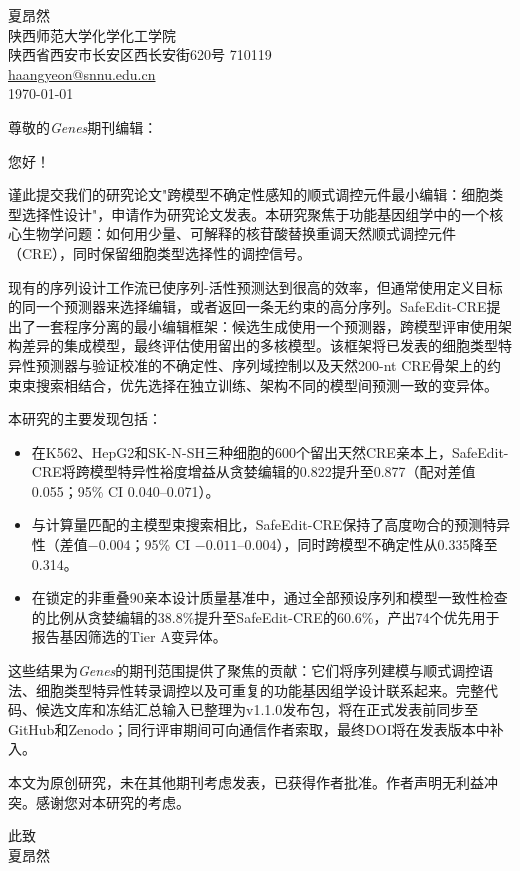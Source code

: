 \documentclass[11pt,a4paper]{article}
\begin{document}
\begin{flushright}
夏昂然\\
陕西师范大学化学化工学院\\
陕西省西安市长安区西长安街620号 710119\\
\href{mailto:haangyeon@snnu.edu.cn}{haangyeon@snnu.edu.cn}\\[1em]
\today
\end{flushright}

尊敬的\emph{Genes}期刊编辑：

您好！

谨此提交我们的研究论文"跨模型不确定性感知的顺式调控元件最小编辑：细胞类型选择性设计"，申请作为研究论文发表。本研究聚焦于功能基因组学中的一个核心生物学问题：如何用少量、可解释的核苷酸替换重调天然顺式调控元件（CRE），同时保留细胞类型选择性的调控信号。

现有的序列设计工作流已使序列-活性预测达到很高的效率，但通常使用定义目标的同一个预测器来选择编辑，或者返回一条无约束的高分序列。SafeEdit-CRE提出了一套程序分离的最小编辑框架：候选生成使用一个预测器，跨模型评审使用架构差异的集成模型，最终评估使用留出的多核模型。该框架将已发表的细胞类型特异性预测器与验证校准的不确定性、序列域控制以及天然200-nt CRE骨架上的约束束搜索相结合，优先选择在独立训练、架构不同的模型间预测一致的变异体。

本研究的主要发现包括：
\begin{itemize}
  \item 在K562、HepG2和SK-N-SH三种细胞的600个留出天然CRE亲本上，SafeEdit-CRE将跨模型特异性裕度增益从贪婪编辑的0.822提升至0.877（配对差值0.055；95\% CI 0.040--0.071）。
  \item 与计算量匹配的主模型束搜索相比，SafeEdit-CRE保持了高度吻合的预测特异性（差值$-0.004$；95\% CI $-0.011$--$0.004$），同时跨模型不确定性从0.335降至0.314。
  \item 在锁定的非重叠90亲本设计质量基准中，通过全部预设序列和模型一致性检查的比例从贪婪编辑的38.8\%提升至SafeEdit-CRE的60.6\%，产出74个优先用于报告基因筛选的Tier A变异体。
\end{itemize}

这些结果为\emph{Genes}的期刊范围提供了聚焦的贡献：它们将序列建模与顺式调控语法、细胞类型特异性转录调控以及可重复的功能基因组学设计联系起来。完整代码、候选文库和冻结汇总输入已整理为v1.1.0发布包，将在正式发表前同步至GitHub和Zenodo；同行评审期间可向通信作者索取，最终DOI将在发表版本中补入。

本文为原创研究，未在其他期刊考虑发表，已获得作者批准。作者声明无利益冲突。感谢您对本研究的考虑。

此致\\[0.8em]
夏昂然
\end{document}
